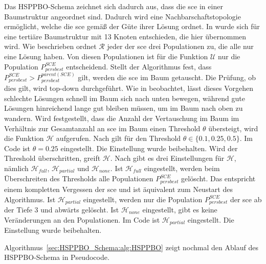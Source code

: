 \documentclass[fontsize=12, a4aper]{scrartcl}
\begin{document}
	Das HSPPBO-Schema zeichnet sich dadurch aus, dass die \ac{sce} in einer Baumstruktur angeordnet sind. Dadurch wird eine Nachbarschaftstopologie ermöglicht, welche die \ac{sce} gemäß der Güte ihrer Lösung ordnet. In \cite{kupfer2021hierarchical} wurde sich für eine tertiäre Baumstruktur mit 13 Knoten entschieden, die hier übernommen wird. Wie beschrieben ordnet \(\mathcal{R}\) jeder der \ac{sce} drei Populationen zu, die alle nur eine Lösung haben. Von diesen Populationen ist für die Funktion \(\mathcal{U}\) nur die Population \(P^{SCE}_{persbest}\) entscheidend. Stellt der Algorithmus fest, dass \(P^{SCE}_{persbest} > P^{parent(SCE)}_{persbest}\) gilt, werden die \ac{sce} im Baum getauscht. Die Prüfung, ob dies gilt, wird \glqq top-down\grqq{} durchgeführt. Wie in \cite{kupfer2021hierarchical} beobachtet, lässt dieses Vorgehen schlechte Lösungen schnell im Baum sich nach unten bewegen, während gute Lösungen hinreichend lange gut bleiben müssen, um im Baum nach oben zu wandern. Wird festgestellt, dass die Anzahl der Vertauschung im Baum im Verhältnis zur Gesamtanzahl an \ac{sce} im Baum einen Threshold \(\theta\) übersteigt, wird die Funktion \(\mathcal{H}\) aufgerufen. Nach \cite{kupfer2021hierarchical} gilt für den Threshold \(\theta \in \{0.1, 0.25, 0.5\}\). Im Code ist \(\theta = 0.25\) eingestellt. Die Einstellung wurde beibehalten. Wird der Threshold überschritten, greift \(\mathcal{H}\). Nach \cite{kupfer2021hierarchical} gibt es drei Einstellungen für \(\mathcal{H}\), nämlich \(\mathcal{H}_{full}\), \(\mathcal{H}_{partial}\) und \(\mathcal{H}_{none}\).  Ist \(\mathcal{H}_{full}\) eingestellt, werden beim Überschreiten des Thresholds alle Populationen \(P^{SCE}_{persbest}\) gelöscht. Das entspricht einem kompletten Vergessen der \ac{sce} und ist äquivalent zum Neustart des Algorithmus. Ist \(\mathcal{H}_{partial}\) eingestellt, werden nur die Population \(P^{SCE}_{persbest}\) der \ac{sce} ab der Tiefe 3 und abwärts gelöscht. Ist \(\mathcal{H}_{none}\) eingestellt, gibt es keine Veränderungen an den Populationen. Im Code ist \(\mathcal{H}_{partial}\) eingestellt. Die Einstellung wurde beibehalten.\hfill\newline
	
	Algorithmus~\ref{sec:HSPPBO_Schema:alg:HSPPBO} zeigt nochmal den Ablauf des HSPPBO-Schema in Pseudocode.
	
\end{document}
